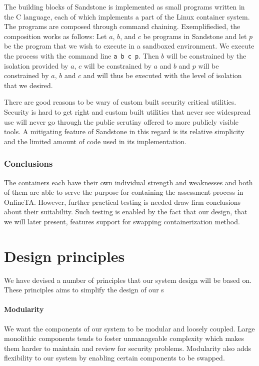 The building blocks of Sandstone is implemented as small programs
written in the C language, each of which implements a part of the
Linux container system. The programs are composed through command
chaining. Exemplifiedied, the composition works as follows: Let $a$,
$b$, and $c$ be programs in Sandstone and let $p$ be the program that
we wish to execute in a sandboxed environment. We execute the process
with the command line \texttt{a b c p}. Then $b$ will be constrained
by the isolation provided by $a$, $c$ will be constrained by $a$ and
$b$ and $p$ will be constrained by $a$, $b$ and $c$ and will thus be
executed with the level of isolation that we desired. \cite{onlineta}

There are good reasons to be wary of custom built security
critical utilities. Security is hard to get right and custom built
utilities that never see widespread use will never go through the
public scrutiny offered to more publicly visible tools. A mitigating
feature of Sandstone in this regard is its relative simplicity and the
limited amount of code used in its implementation.

\subsubsection{Conclusions}
The containers each have their own individual strength and weaknesses
and both of them are able to serve the purpose for containing the
assessment process in OnlineTA. However, further practical testing is
needed draw firm conclusions about their suitability. Such testing is
enabled by the fact that our design, that we will later present,
features support for swapping containerization method.


\section{Design principles}
We have devised a number of principles that our system design will be
based on. These principles aims to simplify the design of our s

\paragraph{Modularity}
We want the components of our system to be modular and loosely
coupled. Large monolithic components tends to foster unmanageable
complexity which makes them harder to maintain and review for security
problems.
Modularity also adds flexibility to our system by enabling certain
components to be swapped.


